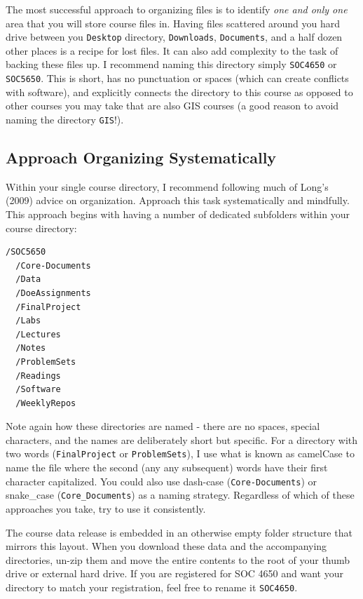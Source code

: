 \documentclass[]{book}
\theoremstyle{definition}
\theoremstyle{definition}
\theoremstyle{definition}
\theoremstyle{remark}
\begin{document}
The most successful approach to organizing files is to identify
\emph{one and only one} area that you will store course files in. Having
files scattered around you hard drive between you \texttt{Desktop}
directory, \texttt{Downloads}, \texttt{Documents}, and a half dozen
other places is a recipe for lost files. It can also add complexity to
the task of backing these files up. I recommend naming this directory
simply \texttt{SOC4650} or \texttt{SOC5650}. This is short, has no
punctuation or spaces (which can create conflicts with software), and
explicitly connects the directory to this course as opposed to other
courses you may take that are also GIS courses (a good reason to avoid
naming the directory \texttt{GIS}!).

\subsection{Approach Organizing
Systematically}\label{approach-organizing-systematically}

Within your single course directory, I recommend following much of
Long's (2009) advice on organization. Approach this task systematically
and mindfully. This approach begins with having a number of dedicated
subfolders within your course directory:

\begin{verbatim}
/SOC5650
  /Core-Documents
  /Data
  /DoeAssignments
  /FinalProject
  /Labs
  /Lectures
  /Notes
  /ProblemSets
  /Readings
  /Software
  /WeeklyRepos
\end{verbatim}

Note again how these directories are named - there are no spaces,
special characters, and the names are deliberately short but specific.
For a directory with two words (\texttt{FinalProject} or
\texttt{ProblemSets}), I use what is known as camelCase to name the file
where the second (any any subsequent) words have their first character
capitalized. You could also use dash-case (\texttt{Core-Documents}) or
snake\_case (\texttt{Core\_Documents}) as a naming strategy. Regardless
of which of these approaches you take, try to use it consistently.

The course data release is embedded in an otherwise empty folder
structure that mirrors this layout. When you download these data and the
accompanying directories, un-zip them and move the entire contents to
the root of your thumb drive or external hard drive. If you are
registered for SOC 4650 and want your directory to match your
registration, feel free to rename it \texttt{SOC4650}.
\end{document}
